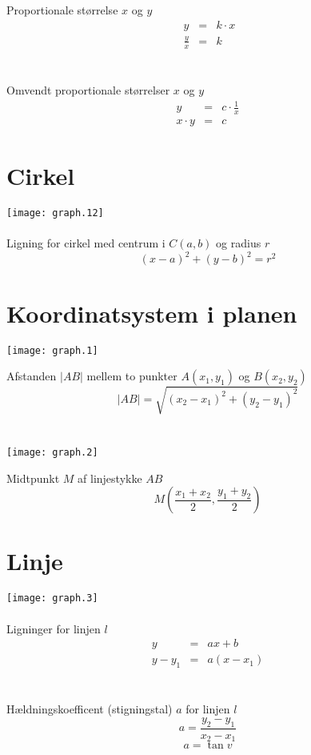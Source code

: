 \documentclass[11pt,a5paper,fleqn,leqno]{book}
\begin{document}
Proportionale størrelse $x$ og $y$
\begin{eqnarray}
\; y & =&  k \cdot x \\
\; \frac{y}{x} & = & k \nonumber
\end{eqnarray}
\\
\\
Omvendt proportionale størrelser $x$ og $y$
\begin{eqnarray}
y & = & c \cdot \frac{1}{x} \\
x \cdot y & = & c \nonumber
\end{eqnarray}

\section{Cirkel}

\texttt{[image: graph.12]}
\\
\\
Ligning for cirkel med centrum i $C(a,b)$ og radius $r$
\begin{equation} \label{eq:cirkel_ligning}
(x-a)^2 + (y-b)^2 = r^2
\end{equation}

\newpage

\section{Koordinatsystem i planen}

\texttt{[image: graph.1]}

Afstanden $|AB|$ mellem to punkter $A(x_1,y_1)$ og $B(x_2,y_2)$
\begin{equation}
|AB| = \sqrt{(x_2-x_1)^2 + (y_2-y_1)^2}
\end{equation}
\\
\\
\texttt{[image: graph.2]}

Midtpunkt $M$ af linjestykke $AB$
\begin{equation}
M\left(\frac{x_1+x_2}{2},\frac{y_1+y_2}{2}\right)
\end{equation}

\vfill

\section{Linje}

\texttt{[image: graph.3]}
\\
\\
Ligninger for linjen $l$
\begin{eqnarray} \label{eq:linje_ligning}
y     & = & ax+b \\
y-y_1 & = & a(x-x_1) \nonumber
\end{eqnarray}
\\
\\
Hældningskoefficent (stigningstal) $a$ for linjen $l$
\begin{equation} \label{eq:linje_haeldning}
a = \frac{y_2 - y_1}{x_2 - x_1}
\end{equation}
\begin{equation}
a = \tan v
\end{equation}
\end{document}
